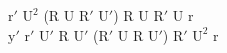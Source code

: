$\text{r}'$ $\text{U}^2$ (R U $\text{R}'$ $\text{U}'$) R U $\text{R}'$ U r\\
$\text{y}'$ $\text{r}'$ $\text{U}'$ R $\text{U}'$ ($\text{R}'$ U R $\text{U}'$) $\text{R}'$ $\text{U}^2$ r\\
\\
